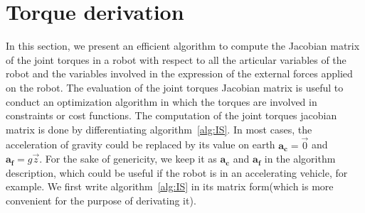 


\section{Torque derivation}
\label{sec:torque_derivation}


In this section, we present an efficient algorithm to compute the Jacobian matrix of the joint torques in a robot with respect to all the articular variables of the robot and the variables involved in the expression of the external forces applied on the robot.
The evaluation of the joint torques Jacobian matrix is useful to conduct an optimization algorithm in which the torques are involved in constraints or cost functions.
The computation of the joint torques jacobian matrix is done by differentiating algorithm~\ref{alg:IS}.
In most cases, the acceleration of gravity could be replaced by its value on earth $\mathbf{a_c} = \vec{0}$ and $\mathbf{a_f} = g \vec{z}$.
For the sake of genericity, we keep it as $\mathbf{a_c}$ and $\mathbf{a_f}$ in the algorithm description, which could be useful if the robot is in an accelerating vehicle, for example.
We first write algorithm~\ref{alg:IS} in its matrix form(which is more convenient for the purpose of derivating it).

